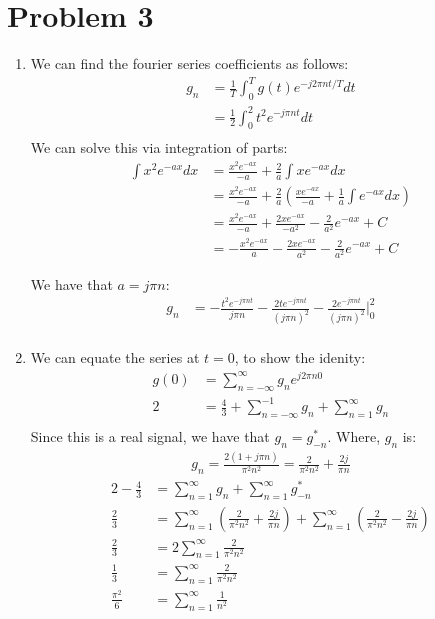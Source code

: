 \documentclass{article}
\begin{document}
\section{Problem 3}
\begin{enumerate}[label=3.\arabic*]
    \item We can find the fourier series coefficients as follows:
    \begin{align*}
        g_n &= \frac{1}{T} \int_{0}^{T} g(t) e^{-j2\pi n t/T} dt \\
        &= \frac{1}{2} \int_{0}^{2} t^2e^{-j\pi n t} dt \\
    \end{align*}
    We can solve this via integration of parts:
    \begin{align*}
        \int x^2 e^{-ax} dx &= \frac{x^2 e^{-ax}}{-a} + \frac{2}{a} \int x e^{-ax} dx \\
        &= \frac{x^2 e^{-ax}}{-a} + \frac{2}{a} \left( \frac{x e^{-ax}}{-a} + \frac{1}{a} \int e^{-ax} dx \right) \\
        &= \frac{x^2 e^{-ax}}{-a} + \frac{2x e^{-ax}}{-a^2} - \frac{2}{a^2} e^{-ax} + C \\
        &= -\frac{x^2 e^{-ax}}{a} - \frac{2x e^{-ax}}{a^2} - \frac{2}{a^2} e^{-ax} + C
    \end{align*}

    We have that $a = j\pi n$:
    \begin{align*}
        g_n &= -\frac{t^2 e^{-j\pi n t}}{j\pi n} - \frac{2t e^{-j\pi n t}}{(j\pi n)^2} - \frac{2 e^{-j\pi n t}}{(j\pi n)^2} \Bigg|_{0}^{2} \\
    \end{align*}

    \item We can equate the series at $t = 0$, to show the idenity:
    \begin{align*}
        g(0) &= \sum_{n=-\infty}^{\infty} g_n e^{j2\pi n 0} \\
        2 &= \frac{4}{3} + \sum_{n=-\infty}^{-1} g_n + \sum_{n=1}^{\infty} g_n \\
    \end{align*}
    Since this is a real signal, we have that $g_n = g_{-n}^*$. Where, $g_n$ is:
    \begin{align*}
        g_n = \frac{2(1+j\pi n)}{\pi^2 n^2} = \frac{2}{\pi^2 n^2} + \frac{2j}{\pi n}
    \end{align*}
    \begin{align*}
        2 - \frac{4}{3} &= \sum_{n=1}^{\infty} g_n + \sum_{n=1}^{\infty} g_{-n}^* \\
        \frac{2}{3} &= \sum_{n=1}^{\infty} \left(\frac{2}{\pi^2 n^2} + \frac{2j}{\pi n}\right) + \sum_{n=1}^{\infty} \left(\frac{2}{\pi^2 n^2} - \frac{2j}{\pi n}\right) \\
        \frac{2}{3} &= 2 \sum_{n=1}^{\infty} \frac{2}{\pi^2 n^2} \\
        \frac{1}{3} &= \sum_{n=1}^{\infty} \frac{2}{\pi^2 n^2} \\
        \frac{\pi^2}{6} &= \sum_{n=1}^{\infty} \frac{1}{n^2}
    \end{align*}


\end{enumerate}
\end{document}
